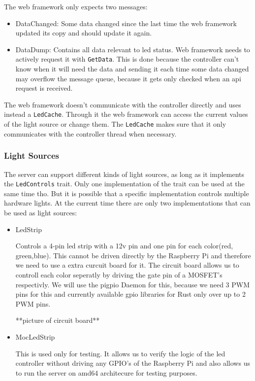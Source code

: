 \documentclass[conference]{IEEEtran}
\begin{document}
The web framework only expects two messages:
\begin{itemize}
    \item DataChanged: 
    Some data changed since the last time the web framework updated its copy and should update it again.
    \item DataDump:
    Contains all data relevant to led status. Web framework needs to actively request it with \texttt{GetData}. This is done
     because the controller can't know when it will need the data and sending it each time some data changed may overflow the
      message queue, because it gets only checked when an api request is received.
\end{itemize}

The web framework doesn't communicate with the controller directly and uses instead a \texttt{LedCache}. Through it the web 
framework can access the current values of the light source or change them. The \texttt{LedCache} makes sure that it only communicates
with the controller thread when necessary.


\subsubsection{Light Sources}
The server can support different kinds of light sources, as long as it implements the \texttt{LedControls} trait. Only one
implementation of the trait can be used at the same time tho. But it is possible that a specific implementation controls multiple
hardware lights. At the current time there are only two implementations that can be used as light sources:

\begin{itemize}
    \item LedStrip
    
    Controls a 4-pin led strip with a 12v pin and one pin for each color(red, green,blue). This cannot be driven directly by the
    Raspberry Pi and therefore we need to use a extra curcuit board\cite{rpiled} for it. The circuit board allows us to controll each
    color seperatly by driving the gate pin of a MOSFET's respectivly. We will use the pigpio Daemon\cite{pigpiod} for this, 
    because we need 3 PWM pins for this and currently available gpio libraries for Rust only over up to 2 PWM pins.
    
    **picture of circuit board**

    \item MocLedStrip
    
    This is used only for testing. It allows us to verify the logic of the led controller without driving any GPIO's of the
    Raspberry Pi and also allows us to run the server on amd64 architecure for testing purposes.
\end{itemize}
\end{document}

